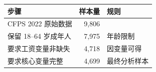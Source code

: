 \begin{tabular}{lrl}
\toprule
步骤 & 样本量 & 规则 \\
\midrule
CFPS 2022 原始数据 & 9,806 &  \\
保留 18--64 岁成年人 & 7,975 & 年龄限制 \\
要求工资变量非缺失 & 4,718 & 因变量可得 \\
要求核心变量完整 & 4,699 & 最终分析样本 \\
\bottomrule
\end{tabular}
